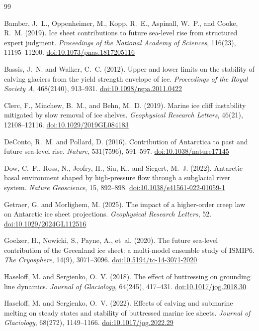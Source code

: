 \documentclass[11pt]{article}
\newcommand{\doi}[1]{\href{https://doi.org/#1}{doi:#1}}
\begin{document}
\begin{thebibliography}{99}

Bamber, J.~L., Oppenheimer, M., Kopp, R.~E., Aspinall, W.~P., and Cooke, R.~M. (2019).
Ice sheet contributions to future sea-level rise from structured expert judgment.
\textit{Proceedings of the National Academy of Sciences}, 116(23), 11195--11200.
\doi{10.1073/pnas.1817205116}

Bassis, J.~N. and Walker, C.~C. (2012).
Upper and lower limits on the stability of calving glaciers from the yield strength envelope of ice.
\textit{Proceedings of the Royal Society A}, 468(2140), 913--931.
\doi{10.1098/rspa.2011.0422}

Clerc, F., Minchew, B.~M., and Behn, M.~D. (2019).
Marine ice cliff instability mitigated by slow removal of ice shelves.
\textit{Geophysical Research Letters}, 46(21), 12108--12116.
\doi{10.1029/2019GL084183}

DeConto, R.~M. and Pollard, D. (2016).
Contribution of {A}ntarctica to past and future sea-level rise.
\textit{Nature}, 531(7596), 591--597.
\doi{10.1038/nature17145}

Dow, C.~F., Ross, N., Jeofry, H., Siu, K., and Siegert, M.~J. (2022).
Antarctic basal environment shaped by high-pressure flow through a subglacial river system.
\textit{Nature Geoscience}, 15, 892--898.
\doi{10.1038/s41561-022-01059-1}

Getraer, G. and Morlighem, M. (2025).
The impact of a higher-order creep law on {A}ntarctic ice sheet projections.
\textit{Geophysical Research Letters}, 52.
\doi{10.1029/2024GL112516}

Goelzer, H., Nowicki, S., Payne, A., et~al. (2020).
The future sea-level contribution of the {G}reenland ice sheet: a multi-model ensemble study of {ISMIP6}.
\textit{The Cryosphere}, 14(9), 3071--3096.
\doi{10.5194/tc-14-3071-2020}

Haseloff, M. and Sergienko, O.~V. (2018).
The effect of buttressing on grounding line dynamics.
\textit{Journal of Glaciology}, 64(245), 417--431.
\doi{10.1017/jog.2018.30}

Haseloff, M. and Sergienko, O.~V. (2022).
Effects of calving and submarine melting on steady states and stability of buttressed marine ice sheets.
\textit{Journal of Glaciology}, 68(272), 1149--1166.
\doi{10.1017/jog.2022.29}


\end{thebibliography}
\end{document}
